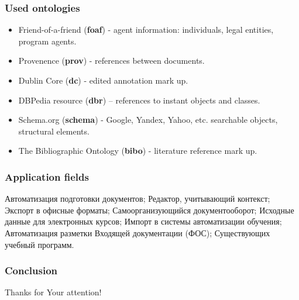\documentclass[10pt]{beamer}
\begin{document}
\begin{frame}
  \frametitle{Used ontologies}
  \begin{itemize}
  \item Friend-of-a-friend (\textbf{foaf}) - agent information: individuals, legal entities, program agents.
  \item Provenence (\textbf{prov}) - references between documents.
  \item Dublin Core (\textbf{dc}) - edited annotation mark up.
  \item DBPedia resource (\textbf{dbr}) – references to instant objects and classes.
  \item Schema.org (\textbf{schema}) - Google, Yandex, Yahoo, etc. searchable objects, structural elements.
  \item The Bibliographic Ontology (\textbf{bibo}) - literature reference mark up.
\end{itemize}
\end{frame}

\begin{frame}
  \frametitle{Application fields}
  Автоматизация подготовки документов;
Редактор, учитывающий контекст;
Экспорт в офисные форматы;
Самоорганизующийся документооборот;
Исходные данные для электронных курсов;
Импорт в системы автоматизации обучения;
Автоматизация разметки
Входящей документации (ФОС);
Существующих учебный программ.

\end{frame}

\begin{frame}
  \frametitle{Conclusion}
  \centering
\end{frame}

\begin{frame}
  \vfill
  \begin{center}
    {\Huge Thanks for Your attention!}
  \end{center}
  \vfill
\end{frame}
\end{document}
